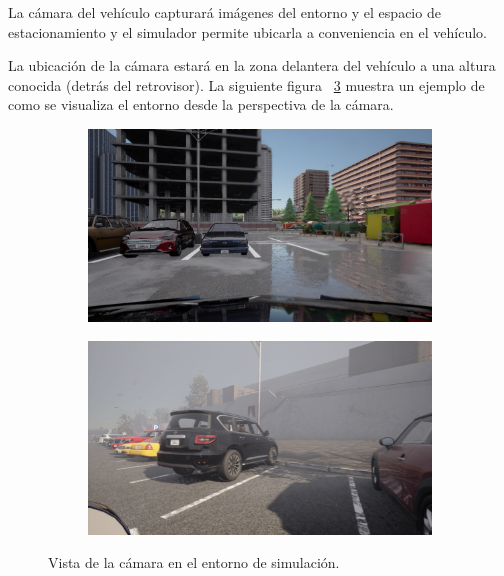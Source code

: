 \noindent
La cámara del vehículo capturará imágenes del entorno y el espacio de estacionamiento y el simulador permite ubicarla a conveniencia en el vehículo.

La ubicación de la cámara estará en la zona delantera del vehículo a una altura conocida (detrás del retrovisor). La siguiente figura ~\ref{fig:camera-view} muestra un ejemplo de como se visualiza el entorno desde la perspectiva de la cámara.

\begin{figure}[!ht]
    \centering
    \begin{subfigure}{0.4\textwidth}
        \includegraphics[width=\textwidth]{img/mirrow_camara_ex}\label {fig:camara}
    \end{subfigure}
    \begin{subfigure}{0.4\textwidth}
        \includegraphics[width=\textwidth]{img/mirrow_camara_ex2}\label {fig:camara2}
    \end{subfigure}
    \caption{Vista de la cámara en el entorno de simulación.}
    \label{fig:camera-view}
\end{figure}





